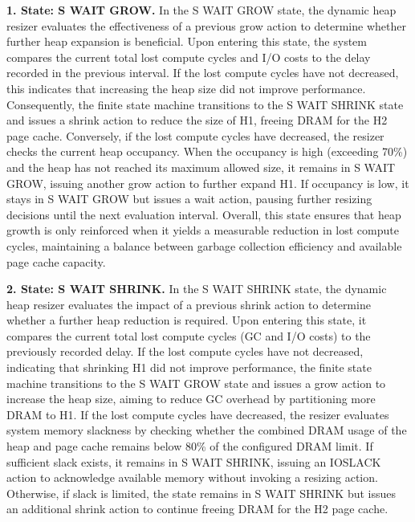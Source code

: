 \textbf{1. State: S WAIT GROW.} In the S WAIT GROW state, the dynamic heap
resizer evaluates the effectiveness of a previous grow action to determine
whether further heap expansion is beneficial. Upon entering this state, the
system compares the current total lost compute cycles and I/O costs to the delay
recorded in the previous interval. If the lost compute cycles have not
decreased, this indicates that increasing the heap size did not improve
performance. Consequently, the finite state machine transitions to the S WAIT
SHRINK state and issues a shrink action to reduce the size of H1, freeing DRAM
for the H2 page cache. Conversely, if the lost compute cycles have decreased,
the resizer checks the current heap occupancy. When the occupancy is high
(exceeding 70\%) and the heap has not reached its maximum allowed size, it
remains in S WAIT GROW, issuing another grow action to further expand H1. If
occupancy is low, it stays in S WAIT GROW but issues a wait action, pausing
further resizing decisions until the next evaluation interval. Overall, this
state ensures that heap growth is only reinforced when it yields a measurable
reduction in lost compute cycles, maintaining a balance between garbage
collection efficiency and available page cache capacity.

\textbf{2. State: S WAIT SHRINK.} In the S WAIT SHRINK state, the dynamic heap
resizer evaluates the impact of a previous shrink action to determine whether a
further heap reduction is required. Upon entering this state, it compares the
current total lost compute cycles (GC and I/O costs) to the previously recorded
delay. If the lost compute cycles have not decreased, indicating that shrinking
H1 did not improve performance, the finite state machine transitions to the S
WAIT GROW state and issues a grow action to increase the heap size, aiming to
reduce GC overhead by partitioning more DRAM to H1. If the lost compute cycles
have decreased, the resizer evaluates system memory slackness by checking
whether the combined DRAM usage of the heap and page cache remains below 80\% of
the configured DRAM limit. If sufficient slack exists, it remains in S WAIT
SHRINK, issuing an IOSLACK action to acknowledge available memory without
invoking a resizing action. Otherwise, if slack is limited, the state remains in
S WAIT SHRINK but issues an additional shrink action to continue freeing DRAM
for the H2 page cache.

